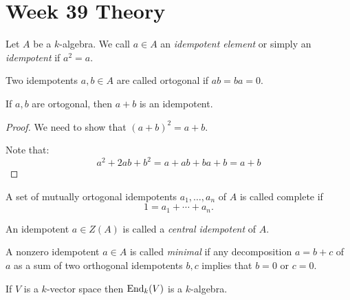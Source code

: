 \newpage
\section{Week 39 Theory}

\begin{defn}

Let \(A\) be a \(k\)-algebra. We call \(a\in A\) an \emph{idempotent element} or simply an \emph{idempotent} if \(a^{2} =a\).
\end{defn}

\begin{defn}

Two idempotents \(a,b\in A\) are called ortogonal if \(ab=ba=0\).

\end{defn}

\begin{prop}

If \(a,b\) are ortogonal, then $a+b$ is an idempotent.

\end{prop}

\begin{proof}
We need to show that
\((a+b)^{2} =a+b\).

Note that:
\[a^{2} +2ab+b^{2} =a+ab+ba+b = a+b\]

\end{proof}

\begin{defn}
A set of mutually ortogonal idempotents \(a_{1},\ldots ,a_{n}\) of \(A\) is called complete if
\[1=a_{1}+\cdots +a_{n}.\]

\end{defn}

\begin{defn}

An idempotent \(a\in Z(A)\) is called a \emph{central idempotent} of \(A\).

\end{defn}

\begin{defn}

A nonzero idempotent \(a\in A\) is called \emph{minimal} if any decomposition \(a=b+c\) of \(a\) as a sum of two orthogonal idempotents \(b,c\) implies that \(b=0\) or \(c=0\).

\end{defn}

\begin{prop}
If $V$ is a $k$-vector space then $\operatorname{End}_{k}(V)$ is a $k$-algebra.
\end{prop}

